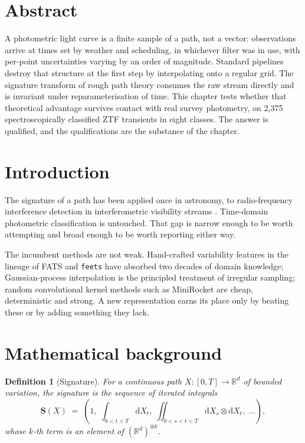 \documentclass[11pt,a4paper]{report}
\newcommand{\sig}{\mathbf{S}}
\newcommand{\R}{\mathbb{R}}
\newtheorem{definition}{Definition}
\begin{document}
\section*{Abstract}

A photometric light curve is a finite sample of a path, not a vector: observations arrive at
times set by weather and scheduling, in whichever filter was in use, with per-point
uncertainties varying by an order of magnitude. Standard pipelines destroy that structure at
the first step by interpolating onto a regular grid. The signature transform of rough path
theory consumes the raw stream directly and is invariant under reparameterisation of time.
This chapter tests whether that theoretical advantage survives contact with real survey
photometry, on 2{,}375 spectroscopically classified ZTF transients in eight classes. The
answer is qualified, and the qualifications are the substance of the chapter.

\section{Introduction}

The signature of a path has been applied once in astronomy, to radio-frequency interference
detection in interferometric visibility streams \cite{signova}. Time-domain photometric
classification is untouched. That gap is narrow enough to be worth attempting and broad
enough to be worth reporting either way.

The incumbent methods are not weak. Hand-crafted variability features in the lineage of FATS
and \texttt{feets} have absorbed two decades of domain knowledge; Gaussian-process
interpolation is the principled treatment of irregular sampling; random convolutional kernel
methods such as MiniRocket \cite{minirocket} are cheap, deterministic and strong. A new
representation earns its place only by beating these or by adding something they lack.

\section{Mathematical background}

\begin{definition}[Signature]
For a continuous path $X : [0,T] \to \R^d$ of bounded variation, the signature is the
sequence of iterated integrals
\[
\sig(X) \;=\; \left(1,\; \int_{0<t<T}\!\mathrm{d}X_t,\;
\iint_{0<s<t<T}\!\mathrm{d}X_s \otimes \mathrm{d}X_t,\; \dots \right),
\]
whose $k$-th term is an element of $(\R^d)^{\otimes k}$.
\end{definition}
\end{document}
